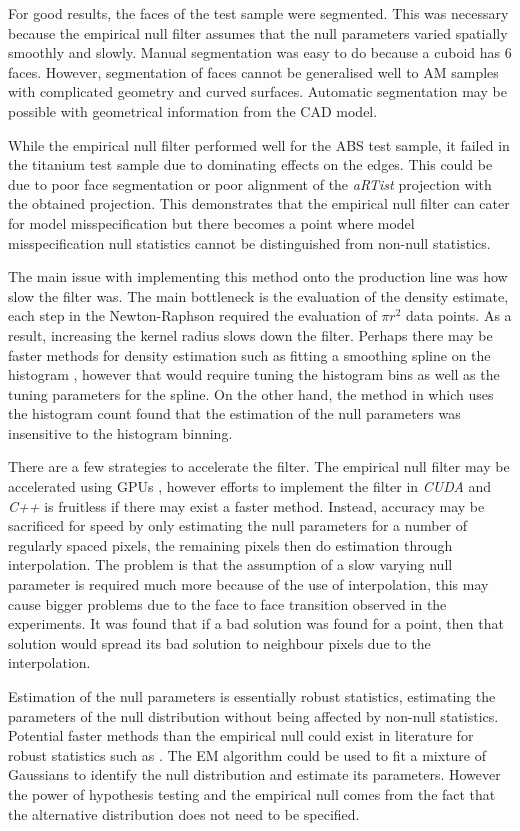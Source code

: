For good results, the faces of the test sample were segmented. This was necessary because the empirical null filter assumes that the null parameters varied spatially smoothly and slowly. Manual segmentation was easy to do because a cuboid has 6 faces. However, segmentation of faces cannot be generalised well to AM samples with complicated geometry and curved surfaces. Automatic segmentation may be possible with geometrical information from the CAD model.

While the empirical null filter performed well for the ABS test sample, it failed in the titanium test sample due to dominating effects on the edges. This could be due to poor face segmentation or poor alignment of the \emph{aRTist} projection with the obtained projection. This demonstrates that the empirical null filter can cater for model misspecification but there becomes a point where model misspecification null statistics cannot be distinguished from non-null statistics.

The main issue with implementing this method onto the production line was how slow the filter was. The main bottleneck is the evaluation of the density estimate, each step in the Newton-Raphson required the evaluation of $\pi r^2$ data points. As a result, increasing the kernel radius slows down the filter. Perhaps there may be faster methods for density estimation such as fitting a smoothing spline on the histogram \citep{efron2004large}, however that would require tuning the histogram bins as well as the tuning parameters for the spline. On the other hand, the method in \cite{schwartzman2008empirical} which uses the histogram count found that the estimation of the null parameters was insensitive to the histogram binning.

There are a few strategies to accelerate the filter. The empirical null filter may be accelerated using GPUs \citep{yang2008parallel, hwu2011gpu, eklund2013medical}, however efforts to implement the filter in \emph{CUDA} and \emph{C++} is fruitless if there may exist a faster method. Instead, accuracy may be sacrificed for speed by only estimating the null parameters for a number of regularly spaced pixels, the remaining pixels then do estimation through interpolation. The problem is that the assumption of a slow varying null parameter is required much more because of the use of interpolation, this may cause bigger problems due to the face to face transition observed in the experiments. It was found that if a bad solution was found for a point, then that solution would spread its bad solution to neighbour pixels due to the interpolation.

Estimation of the null parameters is essentially robust statistics, estimating the parameters of the null distribution without being affected by non-null statistics. Potential faster methods than the empirical null could exist in literature for robust statistics such as \cite{hampel1986robust, rousseeuw1987robust, maronna2006robust, huber2009robust, jewson2018principles}. The EM algorithm \citep{dempster1977maximum} could be used to fit a mixture of Gaussians to identify the null distribution and estimate its parameters. However the power of hypothesis testing and the empirical null comes from the fact that the alternative distribution does not need to be specified.